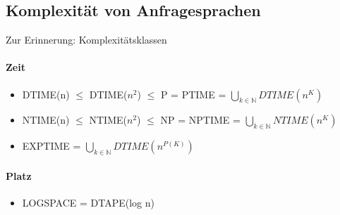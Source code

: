 \documentclass[12pt, a4paper]{article}
\begin{document}
\subsection*{Komplexität von Anfragesprachen}

Zur Erinnerung: Komplexitätsklassen

\paragraph{Zeit}
\begin{itemize}
	\item DTIME(n) $\le$ DTIME($n^2$) $\le$ P = PTIME = $\bigcup_{k \in \mathbb{N}} DTIME(n^K)$
	\item NTIME(n) $\le$ NTIME($n^2$) $\le$ NP = NPTIME = $\bigcup_{k \in \mathbb{N}} NTIME(n^K)$
	\item EXPTIME = $\bigcup_{k \in \mathbb{N}} DTIME(n^{P(K)})$
\end{itemize}

\paragraph{Platz}
\begin{itemize}
	\item LOGSPACE = DTAPE(log n)
\end{itemize}
\end{document}
